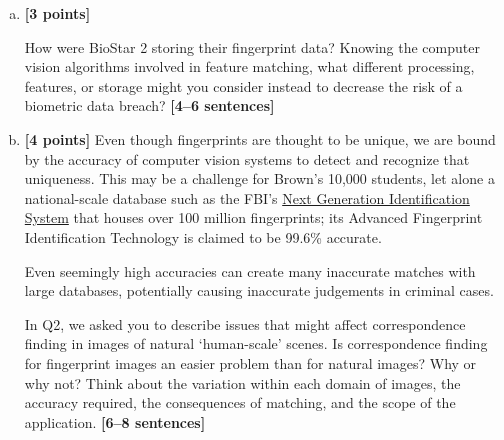\documentclass[11pt]{article}
\begin{document}
\begin{enumerate}[(a)]
    \item \textbf{[3 points]}
    \begin{tcolorbox}[colback=orange!5!white,colframe=orange!75!black]
    How were BioStar 2 storing their fingerprint data? Knowing the computer vision algorithms involved in feature matching, what different processing, features, or storage might you consider instead to decrease the risk of a biometric data breach? \textbf{[4--6 sentences]}
    \end{tcolorbox}


    \pagebreak
    \item 
    \textbf{[4 points]}
Even though fingerprints are thought to be unique, we are bound by the accuracy of computer vision systems to detect and recognize that uniqueness.
This may be a challenge for Brown's 10,000 students, let alone a national-scale database such as the FBI's \href{https://www.fbi.gov/services/cjis/fingerprints-and-other-biometrics/ngi}{Next Generation Identification System} that houses over 100 million fingerprints; its Advanced Fingerprint Identification Technology is claimed to be 99.6\% accurate.

Even seemingly high accuracies can create many inaccurate matches with large databases, potentially causing inaccurate judgements in criminal cases. 

    \begin{tcolorbox}[colback=orange!5!white,colframe=orange!75!black]
    In Q2, we asked you to describe issues that might affect correspondence finding in images of natural `human-scale' scenes. Is correspondence finding for fingerprint images an easier problem than for natural images? Why or why not? Think about the variation within each domain of images, the accuracy required, the consequences of matching, and the scope of the application. \textbf{[6--8 sentences]}


\end{tcolorbox}
\end{enumerate}
\end{document}
